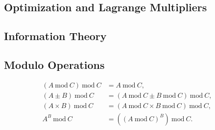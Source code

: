 \subsection{Optimization and Lagrange Multipliers}
\label{additional:misc:opt}

\subsection{Information Theory}
\label{additional:misc:info_theory}

\subsection{Modulo Operations}
\label{additional:misc:modulo}

\begin{subequations}\label{eq:additional:misc:modulo}
\begin{align}
\left(A~\text{mod}~C\right)~\text{mod}~C &= A~\text{mod}~C, \label{eq:misc:additional:modulo:basic} \\
\left(A \pm B\right)~\text{mod}~C &= \left(A~\text{mod}~C \pm B~\text{mod}~C\right)~\text{mod}~C, \label{eq:misc:additional:modulo:pm} \\
\left(A \times B\right)~\text{mod}~C &= \left(A~\text{mod}~C \times B~\text{mod}~C\right)~\text{mod}~C, \label{eq:misc:additional:modulo:multiplication} \\
A^{B}~\text{mod}~C &= \left(\left(A~\text{mod}~C\right)^{B}\right)~\text{mod}~C. \label{eq:misc:additional:modulo:exp}
\end{align}
\end{subequations}
